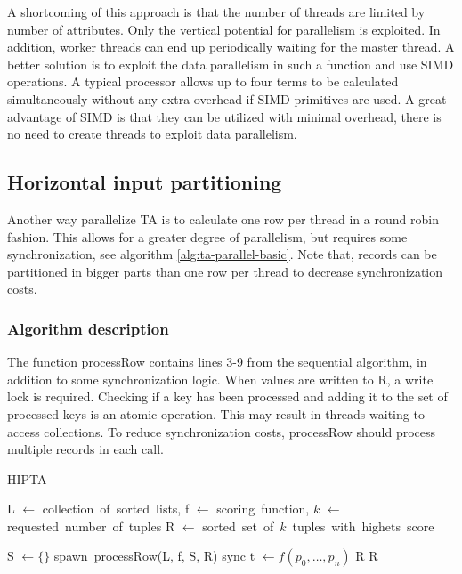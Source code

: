 A shortcoming of this approach is that the number of threads are
limited by number of attributes. Only the vertical potential for
parallelism is exploited. In addition, worker threads can end up
periodically waiting for the master thread. A better solution is to
exploit the data parallelism in such a function and use SIMD
operations. A typical processor allows up to four terms to be
calculated simultaneously without any extra overhead if SIMD
primitives are used. A great advantage of SIMD is that they can be
utilized with minimal overhead, there is no need to create threads to
exploit data parallelism.

\subsection{Horizontal input partitioning}

Another way parallelize TA is to calculate one row per thread in a
round robin fashion. This allows for a greater degree of parallelism,
but requires some synchronization, see algorithm
\ref{alg:ta-parallel-basic}. Note that, records can be partitioned in
bigger parts than one row per thread to decrease synchronization
costs.

\subsubsection{Algorithm description}

The function processRow contains lines 3-9 from the sequential
algorithm, in addition to some synchronization logic. When values are
written to R, a write lock is required. Checking if a key has been
processed and adding it to the set of processed keys is an atomic
operation. This may result in threads waiting to access collections.
To reduce synchronization costs, processRow should process multiple
records in each call.

\begin{algorithm}[H]
	\caption{HIPTA}
	\label{alg:ta-parallel-basic}
	\begin{algorithmic}
		\REQUIRE
			L $\leftarrow$ collection\ of\ sorted\ lists,
			f $\leftarrow$ scoring\ function,
			$k$ $\leftarrow$ requested\ number\ of\ tuples
		\ENSURE R $\leftarrow$ sorted\ set\ of\ $k$\ tuples\ with\ highets\ score

		\STATE S $\leftarrow \{\}$
				\STATE spawn\ processRow(L, f, S, R)
			\ENDFOR
			\STATE sync
			\STATE t $\leftarrow f(\overline{p_0}, \ldots, \overline{p_n})$
				\RETURN R
			\ENDIF
		\ENDWHILE
		\RETURN R
	\end{algorithmic}
\end{algorithm}
